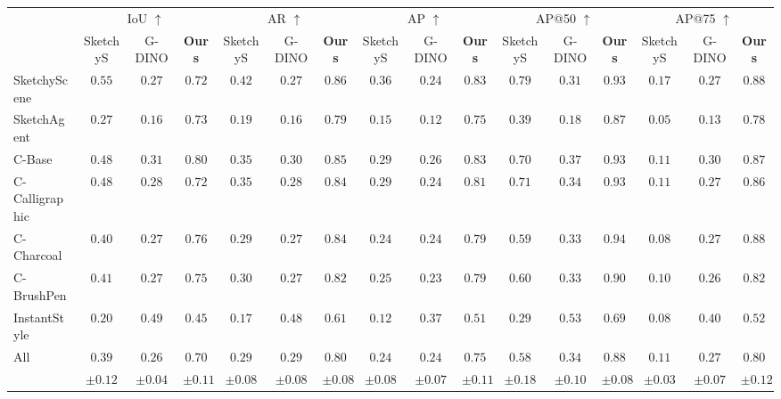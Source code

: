 \begin{table*}
\begin{tabular}{l | c c c | c c c | c c c | c c c | c c c} 
    \toprule
    &
    \multicolumn{3}{c|}{IoU $\uparrow$} & \multicolumn{3}{c|}{AR $\uparrow$} & \multicolumn{3}{c|}{AP $\uparrow$} & \multicolumn{3}{c|}{AP@50 $\uparrow$} & \multicolumn{3}{c}{AP@75 $\uparrow$} \\
    &  SketchyS & G-DINO & \textbf{Ours} & SketchyS & G-DINO & \textbf{Ours} & SketchyS & G-DINO & \textbf{Ours} & SketchyS & G-DINO & \textbf{Ours} & SketchyS & G-DINO & \textbf{Ours} \\
    \midrule
    SketchyScene & $0.55$ & $ 0.27 $ & $\mathbf{0.72}$ & $0.42$ & $0.27$ & $\mathbf{0.86}$ & $0.36$ & $0.24$ & $\mathbf{0.83}$ & $0.79$ & $0.31$ & $\mathbf{0.93}$ & $0.17$ & $0.27$ & $\mathbf{0.88}$ \\
    SketchAgent & $0.27$ & $0.16$ & $\mathbf{0.73}$ & $0.19$ & $0.16$ & $\mathbf{0.79}$ & $0.15$ & $0.12$ & $\mathbf{0.75}$  & $0.39$ & $0.18$ & $\mathbf{0.87}$ & $0.05$ & $0.13$ & $\mathbf{0.78}$ \\
    C-Base & $0.48$ & $0.31$ & $\mathbf{0.80}$ & $0.35$ & $0.30$ & $\mathbf{0.85}$ & $0.29$ & $0.26$ & $\mathbf{0.83}$ & $0.70$ & $0.37$ & $\mathbf{0.93}$ & $0.11$ & $0.30$ & $\mathbf{0.87}$\\
    C-Calligraphic & $0.48$ & $0.28$ & $\mathbf{0.72}$ & $0.35$ & $0.28$ & $\mathbf{0.84}$ & $0.29$ & $0.24$ & $\mathbf{0.81}$ & $0.71$ & $0.34$ & $\mathbf{0.93}$ & $0.11$ & $0.27$ & $\mathbf{0.86}$ \\
    C-Charcoal & $0.40$ & $0.27$ & $\mathbf{0.76}$ & $0.29$ & $0.27$ & $\mathbf{0.84}$ & $0.24$ & $0.24$ & $\mathbf{0.79}$ & $0.59$ & $0.33$ & $\mathbf{0.94}$ & $0.08$ & $0.27$ & $\mathbf{0.88}$ \\
    C-BrushPen & $0.41$ & $0.27$ & $\mathbf{0.75}$ & $0.30$ & $0.27$ & $\mathbf{0.82}$ & $0.25$ & $0.23$ & $\mathbf{0.79}$ & $0.60$ & $0.33$ & $\mathbf{0.90}$ & $0.10$ & $0.26$ & $\mathbf{0.82}$ \\
    InstantStyle & $ 0.20 $ & $\mathbf{0.49} $ & $0.45$ & $0.17 $ & $0.48 $ & $\mathbf{0.61} $ & $0.12 $ & $0.37 $ & $\mathbf{0.51} $ & $0.29$ & $0.53$ & $\mathbf{0.69}$ & $0.08$ & $0.40$ & $\mathbf{0.52}$ \\
    \midrule
     All & $	0.39 $ & $0.26 $ & $\mathbf{0.70}$ & $0.29 $ & $0.29 $ & $\mathbf{0.80 }$ & $0.24 $ & $0.24 $ & $\mathbf{0.75 }$ & $0.58$ & $0.34$ & $\mathbf{0.88}$ & $0.11$ & $0.27$ & $\mathbf{0.80}$ \\
    & \footnotesize{$\pm 0.12 $} & \footnotesize{$\pm 0.04$} & \footnotesize{$\pm 0.11$} & \footnotesize{$\pm 0.08$} & \footnotesize{$\pm 0.08$} & \footnotesize{$\pm 0.08$} & \footnotesize{$\pm 0.08$} & \footnotesize{$\pm 0.07$} & \footnotesize{$\pm 0.11$} & \footnotesize{$\pm 0.18$} &  \footnotesize{$\pm 0.10$} & \footnotesize{$\pm 0.08$}& \footnotesize{$\pm 0.03$} & \footnotesize{$\pm 0.07$} &  \footnotesize{$\pm 0.12$} \\
    \bottomrule
\end{tabular}
\end{table*}
